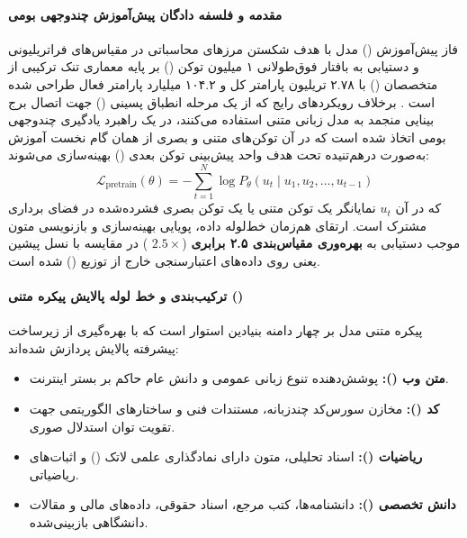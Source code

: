 \item {}

\paragraph*{مقدمه و فلسفه دادگان پیش‌آموزش چندوجهی بومی}
فاز پیش‌آموزش () مدل  با هدف شکستن مرزهای محاسباتی در مقیاس‌های فراتریلیونی و دستیابی به بافتار فوق‌طولانی ۱ میلیون توکن () بر پایه معماری تنک ترکیبی از متخصصان () با ۲.۷۸ تریلیون پارامتر کل و ۱۰۴.۲ میلیارد پارامتر فعال طراحی شده است \cite{kimi2026k3}. برخلاف رویکردهای رایج که از یک مرحله انطباق پسینی () جهت اتصال برج بینایی منجمد به مدل زبانی متنی استفاده می‌کنند، در  یک راهبرد یادگیری چندوجهی بومی اتخاذ شده است که در آن توکن‌های متنی و بصری از همان گام نخست آموزش به‌صورت درهم‌تنیده تحت هدف واحد پیش‌بینی توکن بعدی () بهینه‌سازی می‌شوند:
\begin{equation}
    \mathcal{L}_{\text{pretrain}}(\theta) = - \sum_{t=1}^{N} \log P_\theta(u_t \mid u_1, u_2, \dots, u_{t-1})
\end{equation}
که در آن $u_t$ نمایانگر یک توکن متنی یا یک توکن بصری فشرده‌شده در فضای برداری مشترک است. ارتقای هم‌زمان خط‌لوله داده، پویایی بهینه‌سازی و بازنویسی متون موجب دستیابی به \textbf{بهره‌وری مقیاس‌بندی ۲.۵ برابری} ($2.5\times$ ) در مقایسه با نسل پیشین یعنی  \cite{kimi2025k2} روی داده‌های اعتبارسنجی خارج از توزیع () شده است.

\paragraph*{ترکیب‌بندی و خط لوله پالایش پیکره متنی ()}
پیکره متنی مدل بر چهار دامنه بنیادین استوار است که با بهره‌گیری از زیرساخت پیشرفته پالایش \cite{kimi2025k2, kimi2026k2_5} پردازش شده‌اند:
\begin{itemize}
    \item \textbf{متن وب ():} پوشش‌دهنده تنوع زبانی عمومی و دانش عام حاکم بر بستر اینترنت.
    \item \textbf{کد ():} مخازن سورس‌کد چندزبانه، مستندات فنی و ساختارهای الگوریتمی جهت تقویت توان استدلال صوری.
    \item \textbf{ریاضیات ():} اسناد تحلیلی، متون دارای نمادگذاری علمی لاتک (\en{\LaTeX}) و اثبات‌های ریاضیاتی.
    \item \textbf{دانش تخصصی ():} دانشنامه‌ها، کتب مرجع، اسناد حقوقی، داده‌های مالی و مقالات دانشگاهی بازبینی‌شده.
\end{itemize}

